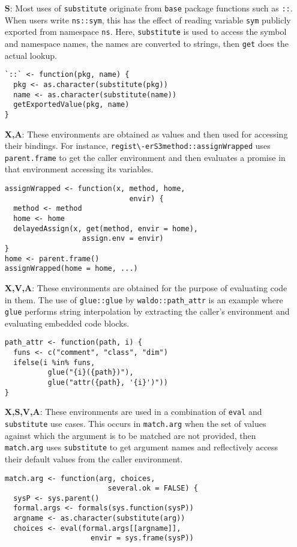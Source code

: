 \documentclass[sigplan,screen]{acmart}
\renewcommand{\c}[1]{\lstinline |#1|\xspace}
\newcommand{\base}{\c{base}}
\newcommand{\eval}{\c{eval}}
\newcommand{\substitute}{\c{substitute}}
\begin{document}
\begin{itemize}
\item[{\bf S}:] Most uses of \c{substitute} originate from \base package
  functions such as \c{::}. When users write \c{ns::sym}, this has the effect of
  reading variable \c{sym} publicly exported from namespace \c{ns}. Here,
  \substitute is used to access the symbol and namespace names, the names are
  converted to strings, then \c{get} does the actual lookup.

\begin{lstlisting}
`::` <- function(pkg, name) {
  pkg <- as.character(substitute(pkg))
  name <- as.character(substitute(name))
  getExportedValue(pkg, name)
}
\end{lstlisting}\medskip

\item[{\bf X,A}:] These environments are obtained as values and then used for
  accessing their bindings. For instance, \c{regist\-erS3method::assignWrapped}
  uses \c{parent.frame} to get the caller environment and then evaluates a
  promise in that environment accessing its variables.

\begin{lstlisting}
assignWrapped <- function(x, method, home,
                             envir) {
  method <- method
  home <- home
  delayedAssign(x, get(method, envir = home),
                  assign.env = envir)
}
home <- parent.frame()
assignWrapped(home = home, ...)
\end{lstlisting}\medskip

\item[{\bf X,V,A}:] These environments are obtained for the purpose of
  evaluating code in them. The use of \c{glue::glue} by \c{waldo::path_attr} is
  an example where \c{glue} performs string interpolation by extracting the
  caller's environment and evaluating embedded code blocks.

\begin{lstlisting}
path_attr <- function(path, i) {
  funs <- c("comment", "class", "dim")
  ifelse(i %in% funs,
          glue("{i}({path})"),
          glue("attr({path}, '{i}')"))
}
\end{lstlisting}\medskip

\item[{\bf X,S,V,A}:] These environments are used in a combination of \eval and
  \substitute use cases. This occurs in \c{match.arg} when the set of values
  against which the argument is to be matched are not provided, then
  \c{match.arg} uses \c{substitute} to get argument names and reflectively
  access their default values from the caller environment.

\begin{lstlisting}
match.arg <- function(arg, choices,
                        several.ok = FALSE) {
  sysP <- sys.parent()
  formal.args <- formals(sys.function(sysP))
  argname <- as.character(substitute(arg))
  choices <- eval(formal.args[[argname]], 
                    envir = sys.frame(sysP))
\end{lstlisting}\medskip

\end{itemize}
\end{document}
